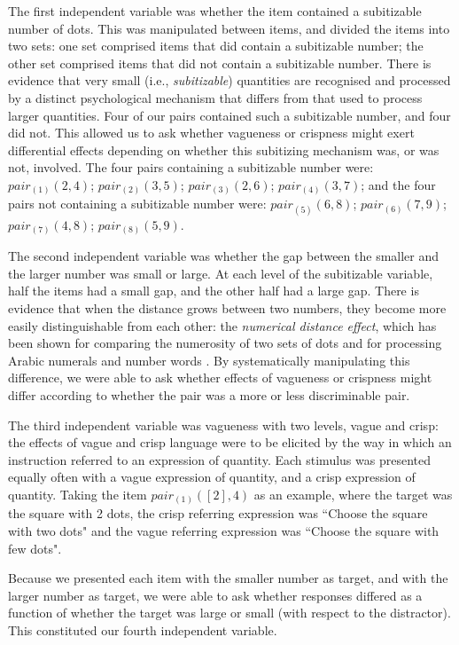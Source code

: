 \documentclass[doc,floatmark]{apa}
\begin{document}
The first independent variable was whether the item contained a subitizable number of dots. This was manipulated between items, and divided the items into two sets: one set comprised items that did contain a subitizable number; the other set comprised items that did not contain a subitizable number. There is evidence \cite{trick1994small} that very small (i.e., \emph{subitizable}) quantities are recognised and processed by a distinct psychological mechanism that differs from that used to process larger quantities. Four of our pairs contained such a subitizable number, and four did not. This allowed us to ask whether vagueness or crispness might exert differential effects depending on whether this subitizing mechanism was, or was not, involved. The four pairs containing a subitizable number were: $pair_{(1)}(2,4)$; $pair_{(2)}(3,5)$; $pair_{(3)}(2,6)$; $pair_{(4)}(3,7)$; and the four pairs not containing a subitizable number were: $pair_{(5)}(6,8)$; $pair_{(6)}(7,9)$; $pair_{(7)}(4,8)$; $pair_{(8)}(5,9)$.

The second independent variable was whether the gap between the smaller and the larger number was small or large. At each level of the subitizable variable, half the items had a small gap, and the other half had a large gap. There is evidence that when the distance grows between two numbers, they become more easily distinguishable from each other: the \emph{numerical distance effect}, which has been shown for comparing the numerosity of two sets of dots \cite{van123} and for processing Arabic numerals and number words \cite{Dehaene199647}. By systematically manipulating this difference, we were able to ask whether effects of vagueness or crispness might differ according to whether the pair was a more or less discriminable pair. 

The third independent variable was vagueness with two levels, vague and crisp: the effects of vague and crisp language were to be elicited by the way in which an instruction referred to an expression of quantity. Each stimulus was presented equally often with a  vague expression of quantity, and a crisp expression of quantity. Taking the item $pair_{(1)}([2],4)$ as an example, where the target was the square with 2 dots, the crisp referring expression was ``Choose the square with two dots" and the vague referring expression was ``Choose the square with few dots".

Because we presented each item with the smaller number as target, and with the larger number as target, we were able to ask whether responses differed as a function of whether the target was large or small (with respect to the distractor). This constituted our fourth independent variable.
\end{document}
